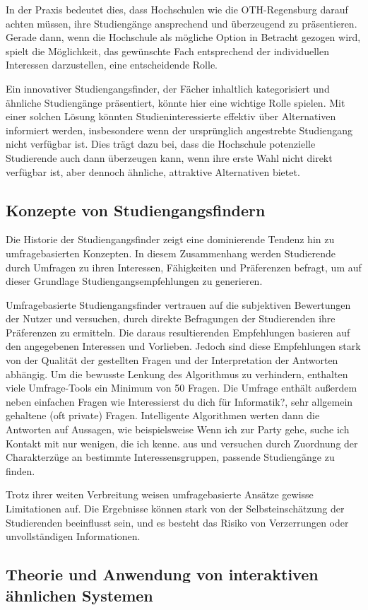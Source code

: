 In der Praxis bedeutet dies, dass Hochschulen wie die OTH-Regensburg darauf
achten müssen, ihre Studiengänge ansprechend und überzeugend zu präsentieren.
Gerade dann, wenn die Hochschule als mögliche Option in Betracht gezogen wird,
spielt die Möglichkeit, das gewünschte Fach entsprechend der individuellen
Interessen darzustellen, eine entscheidende Rolle.

Ein innovativer Studiengangsfinder, der Fächer inhaltlich kategorisiert und
ähnliche Studiengänge präsentiert, könnte hier eine wichtige Rolle spielen. Mit
einer solchen Lösung könnten Studieninteressierte effektiv über Alternativen
informiert werden, insbesondere wenn der ursprünglich angestrebte Studiengang
nicht verfügbar ist. Dies trägt dazu bei, dass die Hochschule potenzielle
Studierende auch dann überzeugen kann, wenn ihre erste Wahl nicht direkt
verfügbar ist, aber dennoch ähnliche, attraktive Alternativen bietet.


\subsection{Konzepte von Studiengangsfindern}
Die Historie der Studiengangsfinder zeigt eine dominierende Tendenz hin zu
umfragebasierten Konzepten. In diesem Zusammenhang werden Studierende durch
Umfragen zu ihren Interessen, Fähigkeiten und Präferenzen befragt, um auf dieser
Grundlage Studiengangsempfehlungen zu generieren.

Umfragebasierte Studiengangsfinder vertrauen auf die subjektiven Bewertungen
der Nutzer und versuchen, durch direkte Befragungen der Studierenden ihre
Präferenzen zu ermitteln. Die daraus resultierenden Empfehlungen basieren auf
den angegebenen Interessen und Vorlieben. Jedoch sind diese Empfehlungen stark
von der Qualität der gestellten Fragen und der Interpretation der Antworten
abhängig. Um die bewusste Lenkung des Algorithmus zu verhindern, enthalten viele
Umfrage-Tools ein Minimum von 50 Fragen. Die Umfrage enthält außerdem neben
einfachen Fragen wie \glqq Interessierst du dich für Informatik?\grqq{}, sehr
allgemein gehaltene (oft private) Fragen. Intelligente Algorithmen werten dann
die Antworten auf Aussagen, wie beispielsweise \glqq Wenn ich zur Party gehe,
suche ich Kontakt mit nur wenigen, die ich kenne.\grqq{} aus und versuchen durch
Zuordnung der Charakterzüge an bestimmte Interessensgruppen, passende
Studiengänge zu finden.

Trotz ihrer weiten Verbreitung weisen umfragebasierte Ansätze gewisse
Limitationen auf. Die Ergebnisse können stark von der Selbsteinschätzung der
Studierenden beeinflusst sein, und es besteht das Risiko von Verzerrungen oder
unvollständigen Informationen.


\subsection{Theorie und Anwendung von interaktiven ähnlichen Systemen}
